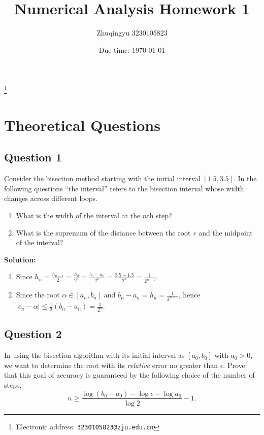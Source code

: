 \documentclass[a4paper]{article}
\begin{document}
\title{Numerical Analysis Homework 1}
\author{Zhuqingyu 3230105823}
\thanks{Electronic address: \texttt{3230105823@zju.edu.cn}}
\date{Due time: \today}
\maketitle
\section*{Theoretical Questions}

\subsection*{Question 1}
Consider the bisection method starting with the initial interval $[1.5,3.5]$. In the following questions ``the interval'' refers to the bisection interval whose width changes across different loops.
\begin{enumerate}[label=(\alph*)]
    \item What is the width of the interval at the $n$th step?
    \item What is the supremum of the distance between the root $r$ and the midpoint of the interval?
\end{enumerate}

\textbf{Solution:}
\begin{enumerate}[label=(\alph*)]
    \item Since $h_{n} = \frac{h_{n-1}}{2} = \frac{h_0}{2^{n}} = \frac{b_0 - a_0}{2^{n}} = \frac{3.5-1.5}{2^{n}} = \frac{1}{2^{n-1}}$.
    
    \item Since the root $\alpha \in [a_n, b_n]$ and $b_n - a_n = h_n = \frac{1}{2^{n-1}}$, hence $\lvert c_n - \alpha \rvert \leq \frac{1}{2}(b_n - a_n) = \frac{1}{2^{n}}$.
\end{enumerate}

\subsection*{Question 2}
In using the bisection algorithm with its initial interval as $[a_0,b_0]$ with $a_0>0$, we want to determine the root with its \textit{relative} error no greater than $\epsilon$. Prove that this goal of accuracy is guaranteed by the following choice of the number of steps,
\[
n \geq \frac{\log(b_0 - a_0) - \log\epsilon - \log a_0}{\log 2} - 1.
\]
\end{document}
